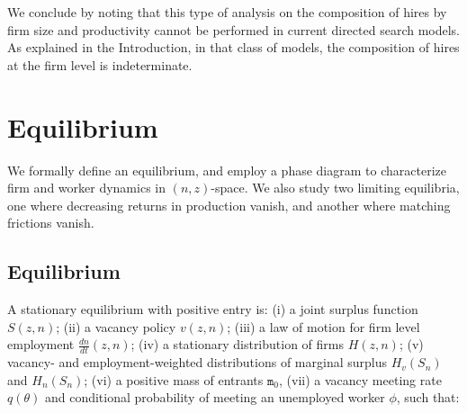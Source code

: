We conclude by noting that this type of analysis on the composition of hires by firm size and productivity cannot be performed in current directed search models.
As explained in the Introduction, in that class of models, the composition of hires at the firm level is indeterminate.

\section{Equilibrium}\label{sec:comparativestatics}
We formally define an equilibrium, and employ a phase diagram to characterize firm and worker dynamics in $(n,z)$-space.
We also study two limiting equilibria, one where decreasing returns in production vanish, and another where matching frictions vanish.

\subsection{Equilibrium}
A stationary equilibrium with positive entry is:
(i) a joint surplus function $S(z,n)$;
(ii) a vacancy policy $v(z,n)$;
(iii) a law of motion for firm level employment $\frac{dn}{dt}(z,n)$;
(iv) a stationary distribution of firms $H(z,n)$;
(v) vacancy- and employment-weighted distributions of marginal surplus $H_v(S_n) $ and $H_n(S_n)$;
(vi) a positive mass of entrants $\mathtt{m}_0$,
(vii) a vacancy meeting rate $q(\theta)$ and conditional probability of meeting an unemployed worker $\phi$, such that:
